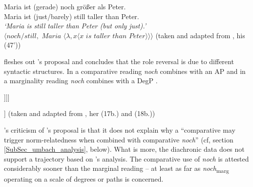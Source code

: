 \documentclass[output=paper,
modfonts
]{langscibook}
\begin{document}
\ea\gll Maria ist (gerade) noch größer als Peter.\\
       Maria ist {(just/barely)} still taller than Peter.\\
\glt   \textit{`Maria is still taller than Peter (but only just).'} \label{NOCH_MARG_EXP} \\
\z
\ea $\langle noch/still,$ $Maria$ $\langle\lambda,x\langle x$ $is$ $taller$ $than$ $Peter\rangle\rangle\rangle$ \label{koenigs_noch_marg} \flushright (taken and adapted from \citeauthor{koenig1977} \citeyearpar{koenig1977}, his (47'))\z


\noindent\citet{umbach2009a_comp} fleshes out \citeauthor{koenig1977}'s \citeyearpar{koenig1977} proposal and concludes that the role reversal is due to different syntactic structures. In a comparative reading \textit{noch} combines with an AP  and in a marginality reading \textit{noch} combines with a DegP .

\begin{exe}
\label{NOCH_COMP_EXPPrime}\relax [$_{\textnormal{\footnotesize{CP}}}$ Maria [$_{\textnormal{\footnotesize{VP}}}$ ist [$_{\textnormal{\footnotesize{DegP}}}$ \textbf{[$_{\textbf{\footnotesize{AP}}}$ noch [$_{\textbf{\footnotesize{AP}}}$ größer ]]} [als Adam]]]] 
\end{exe}

\begin{exe}
\label{NOCH_MARG_EXPPrime}\relax [$_{\textnormal{\footnotesize{CP}}}$ Maria [$_{\textnormal{\footnotesize{VP}}}$ ist \textbf{[$_{\textbf{\footnotesize{DegP}}}$ noch [$_{\textbf{\footnotesize{DegP}}}$ [$_{\textbf{\footnotesize{AP}}}$ größer] [als Peter]]]} ]] \flushright (taken and adapted from \citeauthor{umbach2009a_comp} \citeyearpar{umbach2009a_comp}, her (17b.) and (18b.))
\end{exe}


\noindent\citeauthor{umbach2009a_comp}'s \citeyearpar{umbach2009a_comp} criticism of \citeauthor{koenig1977}'s \citeyearpar{koenig1977} proposal is that it does not explain why a ``comparative may trigger norm-relatedness when combined with comparative \textit{noch}'' (cf, section \ref{SubSec_umbach_analysis}, below). What is more, the diachronic data does not support a trajectory based on \citeauthor{koenig1977}'s analysis. The comparative use of \textit{noch} is attested considerably sooner than the marginal reading -- at least as far as \textit{noch}\textsubscript{marg} operating on a scale of degrees or paths is concerned.
\end{document}
